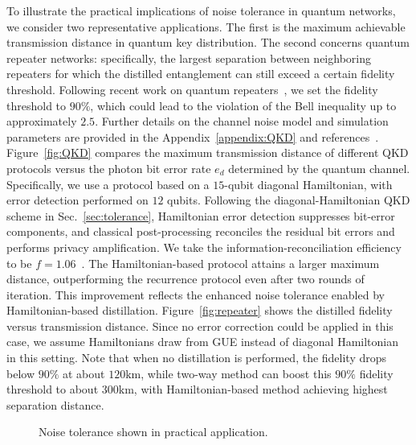 \documentclass[onecolumn,prx,longbibliography,nofootinbib, superscriptaddress]{revtex4-2}
\theoremstyle{recap}
\begin{document}
To illustrate the practical implications of noise tolerance in quantum networks, we consider two representative applications. The first is the maximum achievable transmission distance in quantum key distribution. The second concerns quantum repeater networks: specifically, the largest separation between neighboring repeaters for which the distilled entanglement can still exceed a certain fidelity threshold. Following recent work on quantum repeaters~\cite{Liu2026}, we set the fidelity threshold to $90\%$, which could lead to the violation of the Bell inequality up to approximately $2.5$. Further details on the channel noise model and simulation parameters are provided in the Appendix~\ref{appendix:QKD} and references~\cite{AQT,Liu2026}. Figure~\ref{fig:QKD} compares the maximum transmission distance of different QKD protocols versus the photon bit error rate $e_d$ determined by the quantum channel. Specifically, we use a protocol based on a $15$-qubit diagonal Hamiltonian, with error detection performed on $12$ qubits. Following the diagonal-Hamiltonian QKD scheme in Sec.~\ref{sec:tolerance}, Hamiltonian error detection suppresses bit-error components, and classical post-processing reconciles the residual bit errors and performs privacy amplification. We take the information-reconciliation efficiency to be $f=1.06$~\cite{Zhu24}. The Hamiltonian-based protocol attains a larger maximum distance, outperforming the recurrence protocol even after two rounds of iteration. This improvement reflects the enhanced noise tolerance enabled by Hamiltonian-based distillation. Figure~\ref{fig:repeater} shows the distilled fidelity versus transmission distance. Since no error correction could be applied in this case, we assume Hamiltonians draw from GUE instead of diagonal Hamiltonian in this setting. Note that when no distillation is performed, the fidelity drops below $90\%$ at about $120\mathrm{km}$, while two-way method can boost this $90\%$ fidelity threshold to about $300\mathrm{km}$, with Hamiltonian-based method achieving highest separation distance.

\begin{figure}[htbp]
    \centering
    \hfill %
    \caption{Noise tolerance shown in practical application.}
    \label{fig:combined_plots}
\end{figure}
\end{document}
